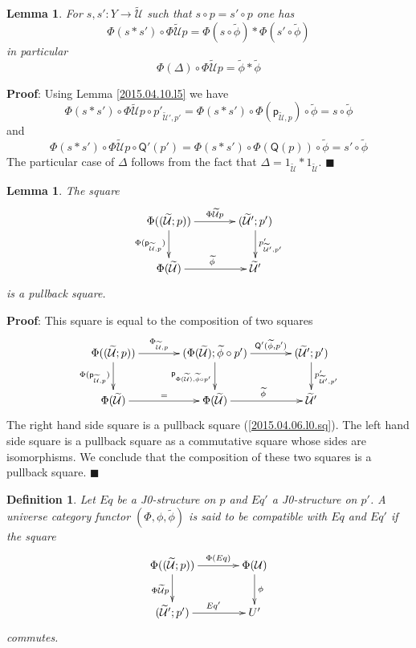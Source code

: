 \documentclass[12pt]{article}
\numberwithin{equation}{section}
\newenvironment{eq}{\begin{equation}}{\end{equation}}
\newenvironment{myproof}{{\bf Proof}:}{$\blacksquare$ \vskip 5mm }
\newtheorem{lemma}[proposition]{Lemma}
\newtheorem{definition}[proposition]{Definition}
\newcommand{\llabel}[1]{\label{#1}}
\newcommand{\sr}{\rightarrow}
\newcommand{\wt}{\widetilde}
\newcommand{\id}{1}            %
\newcommand{\p}{\mathsf{p}}
\newcommand{\U}{\mathcal{U}}
\newcommand{\Q}{\mathsf{Q}}
\begin{document}
%
\begin{lemma}
\llabel{2015.04.10.l6} For $s,s':Y\sr \wt{\U}$ such that $s\circ p=s'\circ p$
one has
%
$$\Phi(s*s')\circ\Phi\wt{\U}p=\Phi(s\circ \wt{\phi})*\Phi(s'\circ\wt{\phi})$$
%
in particular
%
$$\Phi(\Delta)\circ \Phi\wt{\U}p = \wt{\phi}*\wt{\phi}$$
%
\end{lemma}
%
\begin{myproof}
Using Lemma \ref{2015.04.10.l5} we have
%
$$\Phi(s*s')\circ \Phi\wt{\U}p\circ
p'_{\wt{\U}',p'}=\Phi(s*s')\circ\Phi(\p_{\wt{\U},p})\circ\wt{\phi}=s\circ
\wt{\phi}$$
%
and
%
$$\Phi(s*s')\circ \Phi\wt{\U}p\circ \Q'(p')=\Phi(s*s')\circ \Phi(\Q(p))\circ
\wt{\phi}=s'\circ\wt{\phi}$$
%
The particular case of $\Delta$ follows from the fact that
$\Delta=\id_{\wt{\U}}*\id_{\wt{\U}}$.
\end{myproof}
%
\begin{lemma}
\llabel{2015.04.06.l5} The square
%
\begin{eq}\llabel{2015.04.06.eq10-bis}
\begin{xy}
          \xymatrix@C=3pc{ \Phi((\wt{\U};p)) \ar[r]^-{\Phi\wt{\U}p} \ar[d]_{
              \Phi(\p_{\wt{\U},p})} & (\wt{\U}';p')
            \ar[d]^{p'_{\wt{\U}',p'}}\\ \Phi(\wt{\U}) \ar[r]^{\wt{\phi}} &
            \wt{\U}' }
\end{xy}
\end{eq}%
%
is a pullback square.
\end{lemma}
%
\begin{myproof}
This square is equal to the composition of two squares
%
$$
\begin{xy}
          \xymatrix@C=3pc{ \Phi((\wt{\U};p)) \ar[r]^-{\Phi_{\wt{\U},p}}\ar[d]_{
              \Phi(\p_{\wt{\U},p})} & (\Phi(\wt{\U});\wt{\phi}\circ p')
            \ar[r]^-{\Q'(\wt{\phi},p')}\ar[d]_{\p_{\Phi(\wt{\U}),\wt{\phi}\circ
                p'}} & (\wt{\U}';p') \ar[d]^{p'_{\wt{\U}',p'}}\\ \Phi(\wt{\U})
            \ar[r]^{=} & \Phi(\wt{\U}) \ar[r]^{\wt{\phi}} & \wt{\U}' }
\end{xy}
$$
%
The right hand side square is a pullback square (\ref{2015.04.06.l0.sq}). The
left hand side square is a pullback square as a commutative square whose sides
are isomorphisms. We conclude that the composition of these two squares is a
pullback square.
\end{myproof}
%
\begin{definition}
\llabel{2015.04.06.def4} Let $Eq$ be a J0-structure on $p$ and $Eq'$ a
J0-structure on $p'$. A universe category functor $(\Phi,\phi,\wt{\phi})$ is
said to be compatible with $Eq$ and $Eq'$ if the square
%
\begin{eq}\llabel{2015.04.06.eq6}
\begin{xy}
          \xymatrix@C=3pc{ \Phi((\wt{\U};p)) \ar[r]^-{\Phi(Eq)}
            \ar[d]_{\Phi\wt{\U}p} & \Phi(\U) \ar[d]^{\phi}\\ (\wt{\U}';p')
            \ar[r]^{Eq'} & U' }
\end{xy}
\end{eq}%
%
commutes.
\end{definition}
\end{document}
